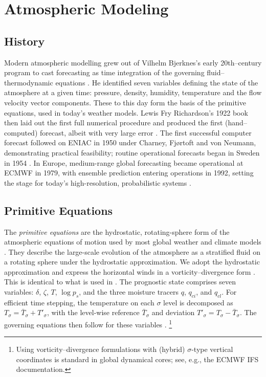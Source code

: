 \section{Atmospheric Modeling}

\subsection{History}
Modern atmospheric modelling grew out of Vilhelm Bjerknes’s early 20th–century program to cast forecasting as time integration of the governing fluid–thermodynamic equations \cite{primitiveeqs}. He identified seven variables defining the state of the atmosphere at a given time: pressure, density, humidity, temperature and the flow velocity vector components. These to this day form the basis of the primitive equations, used in today's weather models. Lewis Fry Richardson’s 1922 book then laid out the first full numerical procedure and produced the first (hand–computed) forecast, albeit with very large error \cite{richardson1922weather}. The first successful computer forecast followed on ENIAC in 1950 under Charney, Fjørtoft and von Neumann, demonstrating practical feasibility; routine operational forecasts began in Sweden in 1954 \cite{charney1950numerical}. In Europe, medium-range global forecasting became operational at ECMWF in 1979, with ensemble prediction entering operations in 1992, setting the stage for today’s high-resolution, probabilistic systems \cite{molteni1996ecmwf}.

\subsection{Primitive Equations}
The \emph{primitive equations} are the hydrostatic, rotating-sphere form of the atmospheric equations of motion used by most global weather and climate models \cite{primitiveeqs}. They describe the large-scale evolution of the atmosphere as a stratified fluid on a rotating sphere under the hydrostatic approximation. We adopt the hydrostatic approximation and express the horizontal winds in a vorticity--divergence form \cite{charney1955use, robert1966integration}. This is identical to what is used in \citet{neuralgcm}. The prognostic state comprises seven variables:
$\delta$, $\zeta$, $T$, $\log p_s$, and the three moisture tracers $q$, $q_{ci}$, and $q_{cl}$.
For efficient time stepping, the temperature on each $\sigma$ level is decomposed as
$T_\sigma = \bar{T}_\sigma + T'_\sigma$, with the level-wise reference $\bar{T}_\sigma$ and deviation
$T'_\sigma = T_\sigma - \bar{T}_\sigma$. The governing equations then follow for these variables \cite{neuralgcm}.
\footnote{Using vorticity--divergence formulations with (hybrid) $\sigma$-type vertical
coordinates is standard in global dynamical cores; see, e.g., the ECMWF IFS documentation.}

